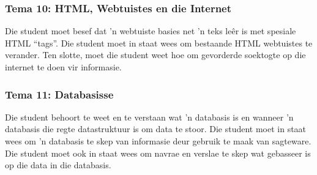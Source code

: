             
        \subsubsection{Tema 10: HTML, Webtuistes en die Internet}
		 Die student moet besef dat 'n webtuiste basies net 'n teks le\^{e}r
		 is met spesiale HTML ``tags''.  Die student moet in staat wees om 
		 bestaande HTML webtuistes te verander.  Ten slotte, moet die student
		 weet hoe om gevorderde soektogte op die internet te doen vir
		 informasie.
        

        \subsubsection{Tema 11: Databasisse}
		 Die student behoort te weet en te verstaan wat 'n databasis is en 
		 wanneer 'n databasis die regte datastruktuur is om data te stoor.
		 Die student moet in staat wees om 'n databasis te skep van informasie
		 deur gebruik te maak van sagteware. Die student moet ook in staat 
		 wees om navrae en verslae te skep wat gebasseer is op die data in die 
		 databasis.